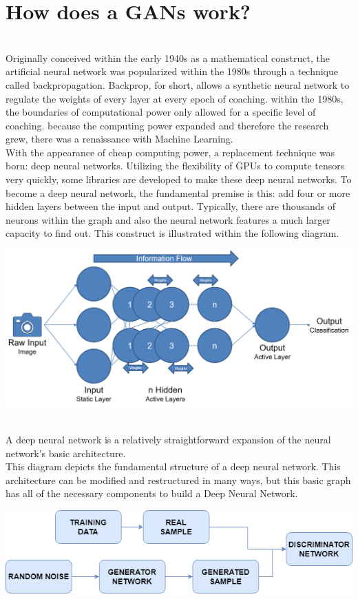 \documentclass[14pt]{article}
\begin{document}
\section{How does a GANs work?}
\\
Originally conceived within the early 1940s as a mathematical construct, the artificial neural network was popularized within the 1980s through a technique called backpropagation. Backprop, for short, allows a synthetic neural network to regulate the weights of every layer at every epoch of coaching. within the 1980s, the boundaries of computational power only allowed for a specific level of coaching. because the computing power expanded and therefore the research grew, there was a renaissance with Machine Learning.
\\
With the appearance of cheap computing power, a replacement technique was born: deep neural networks. Utilizing the flexibility of GPUs to compute tensors very quickly, some libraries are developed to make these deep neural networks. To become a deep neural network, the fundamental premise is this: add four or more hidden layers between the input and output. Typically, there are thousands of neurons within the graph and also the neural network features a much larger capacity to find out. This construct is illustrated within the following diagram.
\\
\begin{center}
    \includegraphics[width = 11 cm ]{2.png}
\end{center}
\\
A deep neural network is a relatively straightforward expansion of the neural network's basic architecture.
\\
This diagram depicts the fundamental structure of a deep neural network. This architecture can be modified and restructured in many ways, but this basic graph has all of the necessary components to build a Deep Neural Network.
\\
\begin{center}
    \includegraphics[width = 11 cm ]{3.png}
\end{center}
\end{document}
